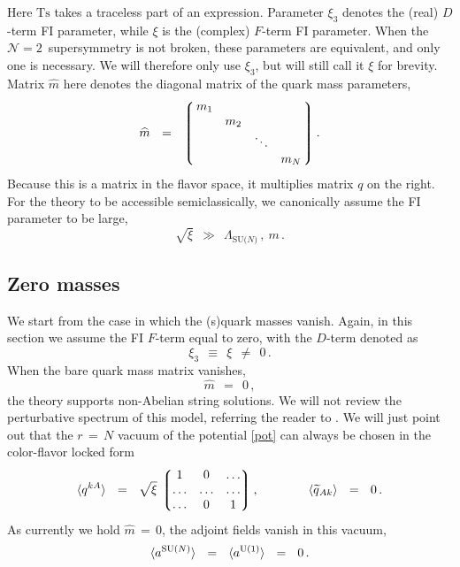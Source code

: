 \documentclass[12pt]{article}
\def\beq{\begin{equation}}
\def\eeq{\end{equation}}
\newcommand{\ntwo}{${\mathcal N}=2$}
\newcommand{\wt}{\widetilde}
\newcommand{\lgr}{\left\lgroup}
\newcommand{\rgr}{\right\rgroup}
\newcommand{\LN}{\Lambda_\text{SU($N$)}}
\newcommand{\aU}{a^{\rm U(1)}}
\newcommand{\aN}{a^\text{SU($N$)}}
\newcommand{\qt}{\wt{q}}
\newcommand{\Ts}{\text{Ts}}
\newcommand{\mhat}{\widehat{m}}
\begin{document}
	Here $ \Ts $ takes a traceless part of an expression.
	Parameter $ \xi_3 $ denotes the (real) $ D $-term FI parameter, while $ \xi $ is the (complex) $ F $-term FI parameter.
	When the \ntwo\, supersymmetry is not broken, these parameters are equivalent, and only one is necessary.
	We will therefore only use $ \xi_3 $, but will still call it $ \xi $ for brevity.
	Matrix $ \mhat $ here denotes the diagonal matrix of the quark mass parameters,
\beq
	\mhat    ~~=~~    \lgr\, \begin{matrix}
			          m_1  &       &        &       \\
				       &  m_2  &        &       \\
				       &       & \ddots &       \\
                                       &       &        &  m_N  
			         \end{matrix} \,\rgr
	.
\eeq
	Because this is a matrix in the flavor space, it multiplies matrix $ q $ on the right.
	For the theory to be accessible semiclassically, we canonically assume the FI parameter to be large,
\[
	\sqrt{\xi}    ~~\gg~~    \LN\,,~  m \,.
\]


\subsection{Zero masses}
	We start from the case in which the (s)quark masses vanish.
	Again, in this section we assume the FI $ F $-term equal to zero, with the $ D $-term denoted as
\[
	\xi_3    ~~\equiv~~    \xi    ~~\neq~~    0\,.
\]
	When the bare quark mass matrix vanishes,
\[
	\mhat    ~~=~~    0\,,
\]
	the theory supports non-Abelian string solutions.
	We will not   review  the perturbative spectrum of this model, referring the reader to \cite{SYrev}.
	We will just point out that the $ r \,=\, N $ vacuum of the potential \eqref{pot} can always be chosen
	in the color-flavor locked form
\beq
\label{qvac}
	\langle q^{kA} \rangle    ~~=~~    \sqrt{\xi}\, 
		\lgr \begin{matrix}
		     		   1    &    0     &    \ldots  \\
				\ldots  &  \ldots  &    \ldots  \\
				\ldots  &    0     &       1
		     \end{matrix} \rgr,
	\qquad\qquad
	\langle \qt{}_{Ak} \rangle    ~~=~~    0\,.
\eeq
	As currently we hold $ \mhat \,=\, 0 $, the adjoint fields vanish in this vacuum,
\beq
	\langle \aN \rangle    ~~=~~    \langle \aU \rangle    ~~=~~    0\,.
\eeq
\end{document}
